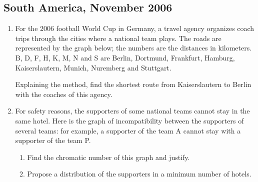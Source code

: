 \newpage
\subsection{South America, November 2006}\label{amsn06}
\begin{enumerate}
\item For the 2006 football World Cup in Germany, a travel agency organizes
      coach trips through the cities where a national team plays. The roads
      are represented by the graph below; the numbers are the distances in
      kilometers. B, D, F, H, K, M, N and S are Berlin, Dortmund, Frankfurt,
      Hamburg, Kaiserslautern, Munich, Nuremberg and Stuttgart.

\begin{center}
\end{center}

      Explaining the method, find the shortest route from Kaiserslautern to
      Berlin with the coaches of this agency.
\item For safety reasons, the supporters of some national teams cannot stay
      in the same hotel. Here is the graph of incompatibility between the
      supporters of several teams: for example, a supporter of the team A
      cannot stay with a supporter of the team P.

\begin{center}
\end{center}

   \begin{enumerate}
   \item Find the chromatic number of this graph and justify.
   \item Propose a distribution of the supporters in a minimum number of
         hotels.
   \end{enumerate}
\end{enumerate}

